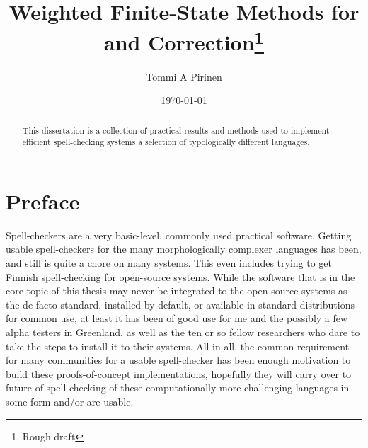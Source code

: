 \documentclass[officiallayout,draft]{unihelcompling}
\title{Weighted Finite-State Methods for \misspelt{Spell-Checking} and Correction\footnote{Rough draft}}
\author{Tommi A Pirinen}
\date{\today}
\begin{document}
\frontmatter

\maketitle

\begin{abstract}
    This dissertation is a collection of practical results and methods used
    to implement efficient spell-checking systems a selection of typologically
    different languages.
\end{abstract}

\tableofcontents

\listoftodos

\mainmatter

\chapter*{Preface}
\label{chap:preface}

Spell-checkers are a very basic-level, commonly used practical software.
Getting usable spell-checkers for the many morphologically complexer languages
has been, and still is quite a chore on many systems. This even includes trying
to get Finnish spell-checking for open-source systems. While the software that
is in the core topic of this thesis may never be integrated to the open source
systems as the de facto standard, installed by default, or available in
standard distributions for common use, at least it has been of good use for me
and the possibly a few alpha testers in Greenland, as well as the ten or so
fellow researchers who dare to take the steps to install it to their systems.
All in all, the common requirement for many communities for a usable
spell-checker has been enough motivation to build these proofs-of-concept
implementations, hopefully they will carry over to future of spell-checking of
these computationally more challenging languages in some form and/or are
usable.
\end{document}

